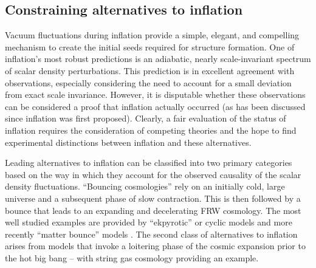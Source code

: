 \subsection{Constraining alternatives to inflation}

Vacuum fluctuations during inflation provide a simple, elegant, and compelling mechanism to create the initial seeds required for structure formation. 
One of inflation's most robust predictions is an adiabatic, nearly
scale-invariant spectrum of scalar density perturbations.
This prediction is in excellent agreement with observations, especially
considering the need to account for a small deviation from exact scale
invariance.  However, it is disputable whether these observations can be
considered a proof that inflation actually occurred (as has been discussed
since inflation was first proposed).
Clearly, a fair evaluation of the status of inflation requires the
consideration of competing theories and the hope to find experimental distinctions between inflation and these alternatives.

Leading alternatives to inflation can be classified into two primary categories based on the 
way in which they account for the observed causality of the scalar density fluctuations.
``Bouncing cosmologies'' rely on an initially cold, large universe and a subsequent phase of
slow contraction. This is then followed by a bounce that leads
to an expanding and decelerating FRW cosmology.  The most well studied examples are provided by 
``ekpyrotic'' or cyclic models \cite{Khoury:2001bz,Khoury:2001wf}
and more recently ``matter bounce'' models \cite{Brandenberger:2012zb,Cai:2014jla,deHaro:2015wda}.
The second class of alternatives to inflation arises from models that invoke a loitering phase of the cosmic expansion prior to the hot big bang -- with 
string gas cosmology \cite{Brandenberger:1988aj,Tseytlin:1991xk,Battefeld:2005av} providing an example. 

